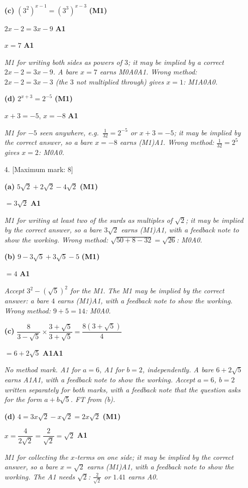 \documentclass[12pt, twoside]{article}
\begin{document}
\begin{enumerate}[itemsep=0.3cm]
\textbf{(c)} $\left(3^{2}\right)^{x - 1} = \left(3^{3}\right)^{x - 3}$ \hfill \textbf{(M1)}

$2x - 2 = 3x - 9$ \hfill \textbf{A1}

$x = 7$ \hfill \textbf{A1}

\emph{M1 for writing both sides as powers of $3$; it may be implied by a
correct $2x - 2 = 3x - 9$. A bare $x = 7$ earns M0A0A1. Wrong method:
$2x - 2 = 3x - 3$ (the $3$ not multiplied through) gives $x = 1$:
M1A0A0.}

\textbf{(d)} $2^{x + 3} = 2^{-5}$ \hfill \textbf{(M1)}

$x + 3 = -5$, \quad $x = -8$ \hfill \textbf{A1}

\emph{M1 for $-5$ seen anywhere, e.g.\ $\frac{1}{32} = 2^{-5}$ or
$x + 3 = -5$; it may be implied by the correct answer, so a bare
$x = -8$ earns (M1)A1. Wrong method:
$\frac{1}{32} = 2^{5}$ gives $x = 2$: M0A0.}

\newpage

\item[4.] [Maximum mark: 8]

\textbf{(a)} $5\sqrt{2} + 2\sqrt{2} - 4\sqrt{2}$ \hfill \textbf{(M1)}

$= 3\sqrt{2}$ \hfill \textbf{A1}

\emph{M1 for writing at least two of the surds as multiples of $\sqrt{2}$;
it may be implied by the correct answer, so a bare $3\sqrt{2}$ earns
(M1)A1, with a feedback note to show the working. Wrong method: $\sqrt{50 + 8 - 32} = \sqrt{26}$: M0A0.}

\textbf{(b)} $9 - 3\sqrt{5} + 3\sqrt{5} - 5$ \hfill \textbf{(M1)}

$= 4$ \hfill \textbf{A1}

\emph{Accept $3^{2} - \left(\sqrt{5}\right)^{2}$ for the M1. The M1 may be
implied by the correct answer: a bare $4$ earns (M1)A1, with a feedback note to show the working.
Wrong method:
$9 + 5 = 14$: M0A0.}

\textbf{(c)} $\dfrac{8}{3 - \sqrt{5}} \times \dfrac{3 + \sqrt{5}}{3 + \sqrt{5}} = \dfrac{8\left(3 + \sqrt{5}\right)}{4}$

$= 6 + 2\sqrt{5}$ \hfill \textbf{A1A1}

\emph{No method mark. A1 for $a = 6$, A1 for $b = 2$, independently. A
bare $6 + 2\sqrt{5}$ earns A1A1, with a feedback note to show the working. Accept $a = 6$, $b = 2$
written separately for both marks, with a feedback note that the question
asks for the form $a + b\sqrt{5}$. FT from (b).}

\textbf{(d)} $4 = 3x\sqrt{2} - x\sqrt{2} = 2x\sqrt{2}$ \hfill \textbf{(M1)}

$x = \dfrac{4}{2\sqrt{2}} = \dfrac{2}{\sqrt{2}} = \sqrt{2}$ \hfill \textbf{A1}

\emph{M1 for collecting the $x$-terms on one side; it may be implied by the
correct answer, so a bare $x = \sqrt{2}$ earns (M1)A1, with a feedback note to show the working. The A1 needs
$\sqrt{2}$: $\frac{2}{\sqrt{2}}$ or $1.41$ earns A0.}

\end{enumerate}
\end{document}
